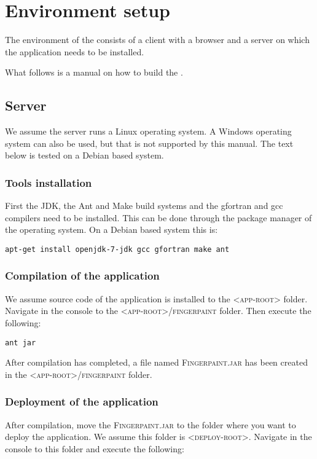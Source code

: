 \chapter{Environment setup}
\label{environment_setup}

The environment of the \applicationname{} consists of a client with a browser and a server on which the application needs to be installed.

What follows is a manual on how to build the \applicationname{}.

\section{Server}
We assume the server runs a Linux operating system. A Windows operating system can also be used, but that is not supported by this manual. The text below is tested on a Debian based system.

\subsection{Tools installation}
\label{sec:building}
First the JDK, the Ant and Make build systems and the gfortran and gcc compilers need to be installed. This can be done through the package manager of the operating system. On a Debian based system this is:

\begin{verbatim}
apt-get install openjdk-7-jdk gcc gfortran make ant
\end{verbatim}

\subsection{Compilation of the application}
\label{sec:compiling}
We assume source code of the application is installed to the \textsc{<app-root>} folder. Navigate in the console to the \textsc{<app-root>/fingerpaint} folder. Then execute the following:

\begin{verbatim}
ant jar
\end{verbatim}

After compilation has completed, a file named \textsc{Fingerpaint.jar} has been created in the \textsc{<app-root>/fingerpaint} folder.

\subsection{Deployment of the application}
\label{sec:deployment}
After compilation, move the \textsc{Fingerpaint.jar} to the folder where you want to deploy the application. We assume this folder is \textsc{<deploy-root>}. Navigate in the console to this folder and execute the following:

